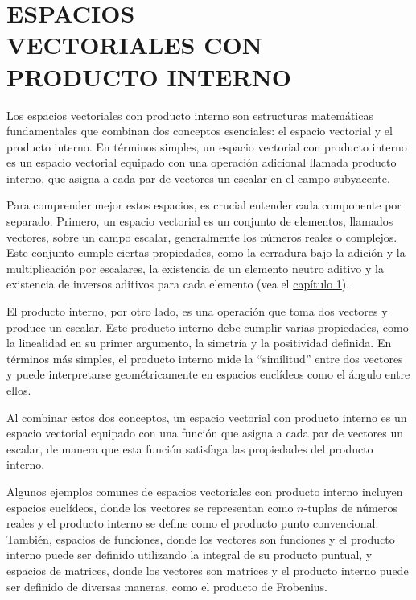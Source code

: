 \chapter[ESPACIOS VECTORIALES CON PRODUCTO INTERNO]{ESPACIOS \\ VECTORIALES CON \\ PRODUCTO INTERNO}
\printchaptertableofcontents

Los espacios vectoriales con producto interno son estructuras matemáticas fundamentales que combinan dos conceptos esenciales: el espacio vectorial y el producto interno. En términos simples, un espacio vectorial con producto interno es un espacio vectorial equipado con una operación adicional llamada producto interno, que asigna a cada par de vectores un escalar en el campo subyacente.

Para comprender mejor estos espacios, es crucial entender cada componente por separado. Primero, un espacio vectorial es un conjunto de elementos, llamados vectores, sobre un campo escalar, generalmente los números reales o complejos. Este conjunto cumple ciertas propiedades, como la cerradura bajo la adición y la multiplicación por escalares, la existencia de un elemento neutro aditivo y la existencia de inversos aditivos para cada elemento (vea el \hyperref[chap:ev]{capítulo 1}).

El producto interno, por otro lado, es una operación que toma dos vectores y produce un escalar. Este producto interno debe cumplir varias propiedades, como la linealidad en su primer argumento, la simetría y la positividad definida. En términos más simples, el producto interno mide la “similitud” entre dos vectores y puede interpretarse geométricamente en espacios euclídeos como el ángulo entre ellos.

Al combinar estos dos conceptos, un espacio vectorial con producto interno es un espacio vectorial equipado con una función que asigna a cada par de vectores un escalar, de manera que esta función satisfaga las propiedades del producto interno.

Algunos ejemplos comunes de espacios vectoriales con producto interno incluyen espacios euclídeos, donde los vectores se representan como $n$-tuplas de números reales y el producto interno se define como el producto punto convencional. También, espacios de funciones, donde los vectores son funciones y el producto interno puede ser definido utilizando la integral de su producto puntual, y espacios de matrices, donde los vectores son matrices y el producto interno puede ser definido de diversas maneras, como el producto de Frobenius.

